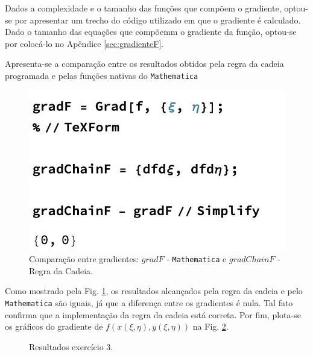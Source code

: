 Dados a complexidade e o tamanho das fun\c{c}\~oes que comp\~oem o gradiente, optou-se por apresentar um trecho do c\'odigo utilizado em que o gradiente \'e calculado. Dado o tamanho das equa\c{c}\~oes que comp\~oemm o gradiente da fun\c{c}\~ao, optou-se por coloc\'a-lo no Ap\^endice \ref{sec:gradienteF}.

Apresenta-se a compara\c{c}\~ao entre os resultados obtidos pela regra da cadeia programada e pelas fun\c{c}\~oes nativas do \texttt{Mathematica}
\begin{figure}[H]
    \centering
    \includegraphics[scale=.22]{Figures/Ex3Comparison.jpeg}
    \caption{Compara\c{c}\~ao entre gradientes: $gradF$ - \texttt{Mathematica} e $gradChainF$ - Regra da Cadeia.}
    \label{fig:gradf}
\end{figure}

Como mostrado pela Fig. \ref{fig:gradf}, os resultados alcan\c{c}ados pela regra da cadeia e pelo \texttt{Mathematica} s\~ao iguais, j\'a que a diferen\c{c}a entre os gradientes \'e nula. Tal fato confirma que a implementa\c{c}\~ao da regra da cadeia est\'a correta. Por fim, plota-se os gr\'aficos do gradiente de $f(x(\xi, \eta), y(\xi, \eta))$ na Fig. \ref{fig:gradfplot}.
\begin{figure}[H]
    \centering
    \hfill
    \caption{Resultados exerc\'icio 3.}
    \label{fig:gradfplot}
\end{figure}